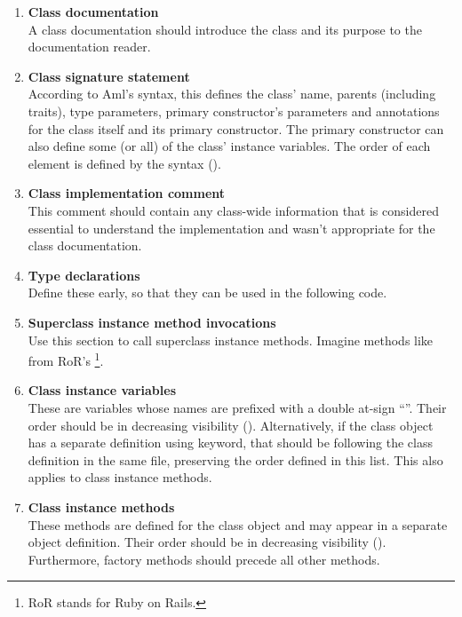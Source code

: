 \begin{enumerate}
\item {\bfseries Class documentation} \hfill \\
A class documentation should introduce the class and its purpose to the documentation reader. 

\item {\bfseries Class signature statement} \hfill \\
According to Aml's syntax, this defines the class' name, parents (including traits), type parameters, primary constructor's parameters and annotations for the class itself and its primary constructor. The primary constructor can also define some (or all) of the class' instance variables. The order of each element is defined by the syntax (). 

\item {\bfseries Class implementation comment} \hfill \\
This comment should contain any class-wide information that is considered essential to understand the implementation and wasn't appropriate for the class documentation. 

\item {\bfseries Type declarations} \hfill \\
Define these early, so that they can be used in the following code. 

\item {\bfseries Superclass instance method invocations} \hfill \\
Use this section to call superclass instance methods. Imagine methods like  from RoR's \footnote{RoR stands for Ruby on Rails.}. 

\item {\bfseries Class instance variables} \hfill \\
These are variables whose names are prefixed with a double at-sign ``''. Their order should be in decreasing visibility (). Alternatively, if the class object has a separate definition using  keyword, that should be following the class definition in the same file, preserving the order defined in this list. This also applies to class instance methods. 

\item {\bfseries Class instance methods} \hfill \\
These methods are defined for the class object and may appear in a separate object definition. Their order should be in decreasing visibility (). Furthermore, factory methods should precede all other methods. 


\end{enumerate}
